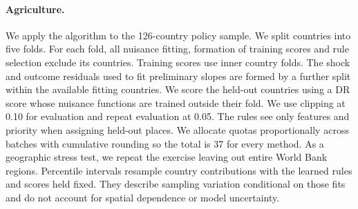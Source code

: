 \paragraph{Agriculture.}
We apply the algorithm to the 126-country policy sample. We split countries
into five folds. For each fold, all nuisance fitting, formation of training
scores and rule selection exclude its countries. Training scores use inner
country folds. The shock and outcome residuals used to fit preliminary slopes
are formed by a further split within the available fitting countries.
We score the held-out countries using a DR score whose nuisance functions are
trained outside their fold. We use clipping at 0.10 for evaluation and repeat
evaluation at 0.05. The rules see only features and priority when assigning
held-out places. We allocate quotas proportionally across batches with
cumulative rounding so the total is 37 for every method. As a geographic
stress test, we repeat the exercise leaving out entire World Bank regions.
Percentile intervals resample country contributions with the learned rules
and scores held fixed. They describe sampling variation conditional on those
fits and do not account for spatial dependence or model uncertainty.

